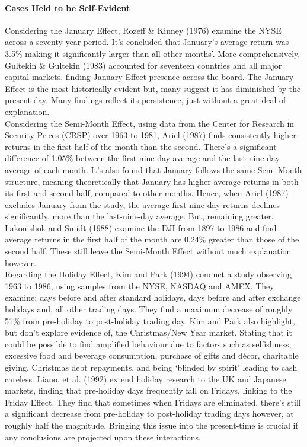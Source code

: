 \documentclass[11pt, english]{article}
\begin{document}
			\paragraph{Cases Held to be Self-Evident}

			Considering the January Effect, Rozeff \& Kinney (1976) examine the NYSE across a seventy-year period. It’s concluded that January’s average return was 3.5\% making it significantly larger than all other months'. More comprehensively, Gultekin \& Gultekin (1983) accounted for seventeen countries and all major capital markets, finding January Effect presence across-the-board. The January Effect is the most historically evident but, many suggest it has diminished by the present day. Many findings reflect its persistence, just without a great deal of explanation.\\

			Considering the Semi-Month Effect, using data from the Center for Research in Security Prices (CRSP) over 1963 to 1981, Ariel (1987) finds consistently higher returns in the first half of the month than the second. There’s a significant difference of 1.05\% between the first-nine-day average and the last-nine-day average of each month. It’s also found that January follows the same Semi-Month structure, meaning theoretically that January has higher average returns in both its first and second half, compared to other months. Hence, when Ariel (1987) excludes January from the study, the average first-nine-day returns declines significantly, more than the last-nine-day average. But, remaining greater. Lakonishok and Smidt (1988) examine the DJI from 1897 to 1986 and find average returns in the first half of the month are 0.24\% greater than those of the second half. These still leave the Semi-Month Effect without much explanation however.\\

			Regarding the Holiday Effect, Kim and Park (1994) conduct a study observing 1963 to 1986, using samples from the NYSE, NASDAQ and AMEX. They examine: days before and after standard holidays, days before and after exchange holidays and, all other trading days. They find a maximum decrease of roughly 51\% from pre-holiday to post-holiday trading day. Kim and Park also highlight, but don’t explore evidence of, the Christmas/New Year market. Stating that it could be possible to find amplified behaviour due to factors such as selfishness, excessive food and beverage consumption, purchase of gifts and décor, charitable giving, Christmas debt repayments, and being `blinded by spirit' leading to cash careless. Liano, et al. (1992) extend holiday research to the UK and Japanese markets, finding that pre-holiday days frequently fall on Fridays, linking to the Friday Effect. They find that sometimes when Fridays are eliminated, there’s still a significant decrease from pre-holiday to post-holiday trading days however, at roughly half the magnitude. Bringing this issue into the present-time is crucial if any conclusions are projected upon these interactions.
\end{document}
